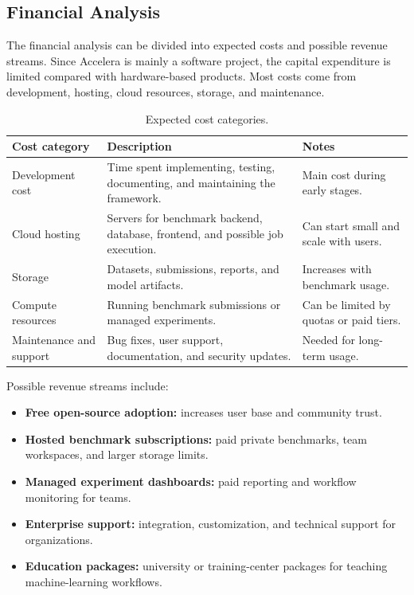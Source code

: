 \documentclass[12pt,a4paper]{report}
\begin{document}
\subsection{Financial Analysis}

The financial analysis can be divided into expected costs and possible revenue
streams. Since Accelera is mainly a software project, the capital expenditure is
limited compared with hardware-based products. Most costs come from development,
hosting, cloud resources, storage, and maintenance.

\begin{table}[!htbp]
\centering
\caption{Expected cost categories.}
\label{tab:expected-costs}
\small
\renewcommand{\arraystretch}{1.15}
\setlength{\tabcolsep}{4pt}
\begin{tabular}{p{}p{}p{}}
\toprule
Cost category & Description & Notes \\
\midrule
Development cost &
Time spent implementing, testing, documenting, and maintaining the framework. &
Main cost during early stages. \\

Cloud hosting &
Servers for benchmark backend, database, frontend, and possible job execution. &
Can start small and scale with users. \\

Storage &
Datasets, submissions, reports, and model artifacts. &
Increases with benchmark usage. \\

Compute resources &
Running benchmark submissions or managed experiments. &
Can be limited by quotas or paid tiers. \\

Maintenance and support &
Bug fixes, user support, documentation, and security updates. &
Needed for long-term usage. \\
\bottomrule
\end{tabular}
\renewcommand{\arraystretch}{1.0}
\end{table}

Possible revenue streams include:

\begin{itemize}
  \item \textbf{Free open-source adoption:} increases user base and community
  trust.
  \item \textbf{Hosted benchmark subscriptions:} paid private benchmarks, team
  workspaces, and larger storage limits.
  \item \textbf{Managed experiment dashboards:} paid reporting and workflow
  monitoring for teams.
  \item \textbf{Enterprise support:} integration, customization, and technical
  support for organizations.
  \item \textbf{Education packages:} university or training-center packages for
  teaching machine-learning workflows.
\end{itemize}
\end{document}
